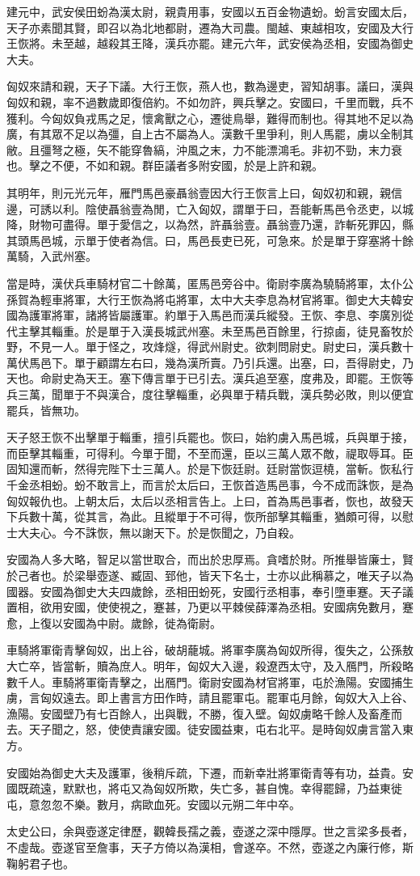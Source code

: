建元中，武安侯田蚡為漢太尉，親貴用事，安國以五百金物遺蚡。蚡言安國太后，天子亦素聞其賢，即召以為北地都尉，遷為大司農。閩越、東越相攻，安國及大行王恢將。未至越，越殺其王降，漢兵亦罷。建元六年，武安侯為丞相，安國為御史大夫。

匈奴來請和親，天子下議。大行王恢，燕人也，數為邊吏，習知胡事。議曰，漢與匈奴和親，率不過數歲即復倍約。不如勿許，興兵擊之。安國曰，千里而戰，兵不獲利。今匈奴負戎馬之足，懷禽獸之心，遷徙鳥舉，難得而制也。得其地不足以為廣，有其眾不足以為彊，自上古不屬為人。漢數千里爭利，則人馬罷，虜以全制其敝。且彊弩之極，矢不能穿魯縞，沖風之末，力不能漂鴻毛。非初不勁，末力衰也。擊之不便，不如和親。群臣議者多附安國，於是上許和親。

其明年，則元光元年，雁門馬邑豪聶翁壹因大行王恢言上曰，匈奴初和親，親信邊，可誘以利。陰使聶翁壹為閒，亡入匈奴，謂單于曰，吾能斬馬邑令丞吏，以城降，財物可盡得。單于愛信之，以為然，許聶翁壹。聶翁壹乃還，詐斬死罪囚，縣其頭馬邑城，示單于使者為信。曰，馬邑長吏已死，可急來。於是單于穿塞將十餘萬騎，入武州塞。

當是時，漢伏兵車騎材官二十餘萬，匿馬邑旁谷中。衛尉李廣為驍騎將軍，太仆公孫賀為輕車將軍，大行王恢為將屯將軍，太中大夫李息為材官將軍。御史大夫韓安國為護軍將軍，諸將皆屬護軍。約單于入馬邑而漢兵縱發。王恢、李息、李廣別從代主擊其輜重。於是單于入漢長城武州塞。未至馬邑百餘里，行掠鹵，徒見畜牧於野，不見一人。單于怪之，攻烽燧，得武州尉史。欲刺問尉史。尉史曰，漢兵數十萬伏馬邑下。單于顧謂左右曰，幾為漢所賣。乃引兵還。出塞，曰，吾得尉史，乃天也。命尉史為天王。塞下傳言單于已引去。漢兵追至塞，度弗及，即罷。王恢等兵三萬，聞單于不與漢合，度往擊輜重，必與單于精兵戰，漢兵勢必敗，則以便宜罷兵，皆無功。

天子怒王恢不出擊單于輜重，擅引兵罷也。恢曰，始約虜入馬邑城，兵與單于接，而臣擊其輜重，可得利。今單于聞，不至而還，臣以三萬人眾不敵，禔取辱耳。臣固知還而斬，然得完陛下士三萬人。於是下恢廷尉。廷尉當恢逗橈，當斬。恢私行千金丞相蚡。蚡不敢言上，而言於太后曰，王恢首造馬邑事，今不成而誅恢，是為匈奴報仇也。上朝太后，太后以丞相言告上。上曰，首為馬邑事者，恢也，故發天下兵數十萬，從其言，為此。且縱單于不可得，恢所部擊其輜重，猶頗可得，以慰士大夫心。今不誅恢，無以謝天下。於是恢聞之，乃自殺。

安國為人多大略，智足以當世取合，而出於忠厚焉。貪嗜於財。所推舉皆廉士，賢於己者也。於梁舉壺遂、臧固、郅他，皆天下名士，士亦以此稱慕之，唯天子以為國器。安國為御史大夫四歲餘，丞相田蚡死，安國行丞相事，奉引墮車蹇。天子議置相，欲用安國，使使視之，蹇甚，乃更以平棘侯薛澤為丞相。安國病免數月，蹇愈，上復以安國為中尉。歲餘，徙為衛尉。

車騎將軍衛青擊匈奴，出上谷，破胡蘢城。將軍李廣為匈奴所得，復失之，公孫敖大亡卒，皆當斬，贖為庶人。明年，匈奴大入邊，殺遼西太守，及入鴈門，所殺略數千人。車騎將軍衛青擊之，出鴈門。衛尉安國為材官將軍，屯於漁陽。安國捕生虜，言匈奴遠去。即上書言方田作時，請且罷軍屯。罷軍屯月餘，匈奴大入上谷、漁陽。安國壁乃有七百餘人，出與戰，不勝，復入壁。匈奴虜略千餘人及畜產而去。天子聞之，怒，使使責讓安國。徒安國益東，屯右北平。是時匈奴虜言當入東方。

安國始為御史大夫及護軍，後稍斥疏，下遷，而新幸壯將軍衛青等有功，益貴。安國既疏遠，默默也，將屯又為匈奴所欺，失亡多，甚自愧。幸得罷歸，乃益東徙屯，意忽忽不樂。數月，病歐血死。安國以元朔二年中卒。

太史公曰，余與壺遂定律歷，觀韓長孺之義，壺遂之深中隱厚。世之言梁多長者，不虛哉。壺遂官至詹事，天子方倚以為漢相，會遂卒。不然，壺遂之內廉行修，斯鞠躬君子也。